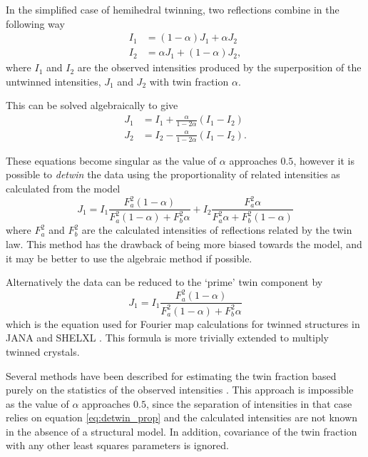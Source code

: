 \documentclass[pdf]{iucr}
\begin{document}
In the simplified case of hemihedral twinning, two reflections combine in the following way 
\begin{align}
I_1 &= (1 - \alpha) J_1 + \alpha J_2 \\
I_2 &= \alpha J_1 + (1- \alpha) J_2
\label{eq:twin_frac}
,
\end{align}
where $I_1$ and $I_2$ are the observed intensities produced by the superposition of the untwinned intensities, $J_1$ and $J_2$ with twin fraction $\alpha$.

This can be solved algebraically \cite{Britton:a08682,Grainger:a06498,Zachariasen:a04610} to give
\begin{align}
J_1 &= I_1 + \frac{\alpha}{1 - 2 \alpha} (I_1 - I_2) \\
J_2 &= I_2 - \frac{\alpha}{1 - 2 \alpha} (I_1 - I_2)
.
\label{eq:detwin_alg}
\end{align}

These equations become singular as the value of $\alpha$ approaches $0.5$, however it is possible to \emph{detwin} the data using the proportionality of related intensities as calculated from the model
\begin{equation}
J_1 = I_1 \frac{F_a^2 (1 - \alpha)}{F_a^2 (1 - \alpha) + F_b^2 \alpha} + I_2 \frac{F_a^2 \alpha}{F_a^2 \alpha + F_b^2 (1 - \alpha)}
\label{eq:detwin_prop}
\end{equation}
where $F_a^2$ and $F_b^2$ are the calculated intensities of reflections related by the twin law. This method has the drawback of being more biased towards the model, and it may be better to use the algebraic method if possible.

Alternatively the data can be reduced to the `prime' twin component by
\begin{equation}
J_1 = I_1 \frac{F_a^2 (1 - \alpha)}{F_a^2 (1 - \alpha) + F_b^2 \alpha}
\label{eq:detwin_prime}
\end{equation}
which is the equation used for Fourier map calculations for twinned structures in JANA \cite{JANA:man98,Dusek:hn0119} and SHELXL \cite{SHELX:man97}. This formula is more trivially extended to multiply twinned crystals.

Several methods have been described for estimating the twin fraction based purely on the statistics of the observed intensities \cite{Britton:a08682,Murray-Rust:a10328}. This approach is impossible as the value of $\alpha$ approaches $0.5$, since the separation of intensities in that case relies on equation \ref{eq:detwin_prop} and the calculated intensities are not known in the absence of a structural model. In addition, covariance of the twin fraction with any other least squares parameters is ignored.
\end{document}
